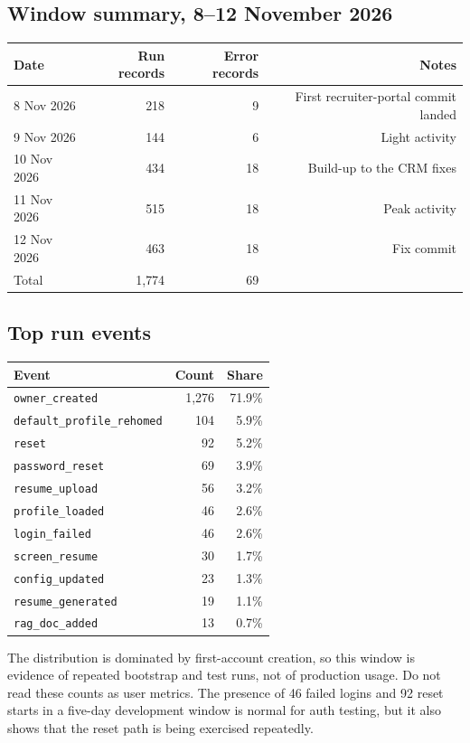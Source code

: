 \documentclass[11pt,a4paper]{article}
\newcommand{\code}[1]{\texttt{#1}}
\begin{document}
\subsection{Window summary, 8--12 November 2026}
\begin{center}
\begin{tabular}{@{}lrrr@{}}
\toprule
\textbf{Date} & \textbf{Run records} & \textbf{Error records} &
\textbf{Notes}\\
\midrule
8 Nov 2026 & 218 & 9 & First recruiter-portal commit landed\\
9 Nov 2026 & 144 & 6 & Light activity\\
10 Nov 2026 & 434 & 18 & Build-up to the CRM fixes\\
11 Nov 2026 & 515 & 18 & Peak activity\\
12 Nov 2026 & 463 & 18 & Fix commit\\
\midrule
Total & 1{,}774 & 69 & \\
\bottomrule
\end{tabular}
\end{center}

\subsection{Top run events}
\begin{center}
\begin{tabular}{@{}lrr@{}}
\toprule
\textbf{Event} & \textbf{Count} & \textbf{Share}\\
\midrule
\code{owner\_created} & 1{,}276 & 71.9\%\\
\code{default\_profile\_rehomed} & 104 & 5.9\%\\
\code{reset} & 92 & 5.2\%\\
\code{password\_reset} & 69 & 3.9\%\\
\code{resume\_upload} & 56 & 3.2\%\\
\code{profile\_loaded} & 46 & 2.6\%\\
\code{login\_failed} & 46 & 2.6\%\\
\code{screen\_resume} & 30 & 1.7\%\\
\code{config\_updated} & 23 & 1.3\%\\
\code{resume\_generated} & 19 & 1.1\%\\
\code{rag\_doc\_added} & 13 & 0.7\%\\
\bottomrule
\end{tabular}
\end{center}

The distribution is dominated by first-account creation, so this window is
evidence of repeated bootstrap and test runs, not of production usage. Do not
read these counts as user metrics. The presence of 46 failed logins and 92
reset starts in a five-day development window is normal for auth testing, but
it also shows that the reset path is being exercised repeatedly.
\end{document}
